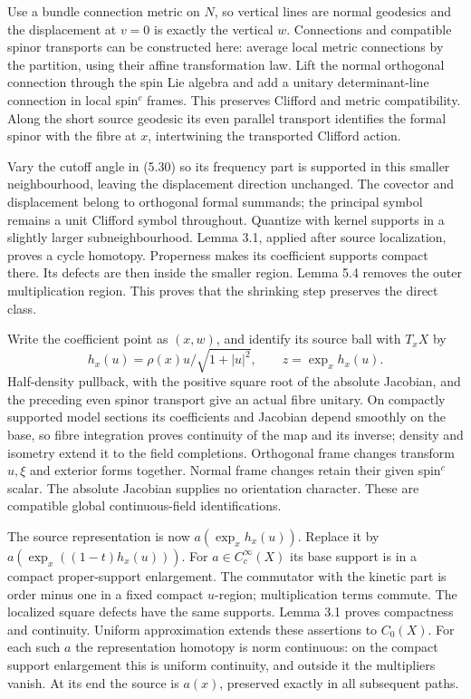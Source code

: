 \documentclass[
  11pt,
]{article}
\begin{document}
Use a bundle connection metric on \(N\), so vertical lines are normal
geodesics and the displacement at \(v=0\) is exactly the vertical \(w\).
Connections and compatible spinor transports can be constructed here:
average local metric connections by the partition, using their affine
transformation law. Lift the normal orthogonal connection through the
spin Lie algebra and add a unitary determinant-line connection in local
spin\(^{c}\) frames. This preserves Clifford and metric compatibility.
Along the short source geodesic its even parallel transport identifies
the formal spinor with the fibre at \(x\), intertwining the transported
Clifford action.

Vary the cutoff angle in (5.30) so its frequency part is supported in
this smaller neighbourhood, leaving the displacement direction
unchanged. The covector and displacement belong to orthogonal formal
summands; the principal symbol remains a unit Clifford symbol
throughout. Quantize with kernel supports in a slightly larger
subneighbourhood. Lemma 3.1, applied after source localization, proves a
cycle homotopy. Properness makes its coefficient supports compact there.
Its defects are then inside the smaller region. Lemma 5.4 removes the
outer multiplication region. This proves that the shrinking step
preserves the direct class.

Write the coefficient point as \((x,w)\), and identify its source ball
with \(T_xX\) by \[
h_x(u)=\rho(x)u/\sqrt{1+|u|^2},\qquad
z=\exp_x h_x(u).
\tag{5.32}
\] Half-density pullback, with the positive square root of the absolute
Jacobian, and the preceding even spinor transport give an actual fibre
unitary. On compactly supported model sections its coefficients and
Jacobian depend smoothly on the base, so fibre integration proves
continuity of the map and its inverse; density and isometry extend it to
the field completions. Orthogonal frame changes transform \(u,\xi\) and
exterior forms together. Normal frame changes retain their given
spin\(^{c}\) scalar. The absolute Jacobian supplies no orientation
character. These are compatible global continuous-field identifications.

The source representation is now \(a(\exp_x h_x(u))\). Replace it by
\(a(\exp_x((1-t)h_x(u)))\). For \(a\in C_c^\infty(X)\) its base support
is in a compact proper-support enlargement. The commutator with the
kinetic part is order minus one in a fixed compact \(u\)-region;
multiplication terms commute. The localized square defects have the same
supports. Lemma 3.1 proves compactness and continuity. Uniform
approximation extends these assertions to \(C_0(X)\). For each such
\(a\) the representation homotopy is norm continuous: on the compact
support enlargement this is uniform continuity, and outside it the
multipliers vanish. At its end the source is \(a(x)\), preserved exactly
in all subsequent paths.
\end{document}
